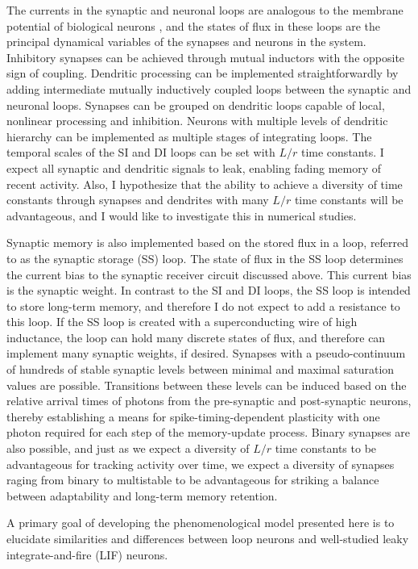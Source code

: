\documentclass[twocolumn]{article}
\begin{document}
The currents in the synaptic and neuronal loops are analogous to the membrane potential of biological neurons \cite{daab2001,geki2002}, and the states of flux in these loops are the principal dynamical variables of the synapses and neurons in the system. Inhibitory synapses can be achieved through mutual inductors with the opposite sign of coupling. Dendritic processing can be implemented straightforwardly by adding intermediate mutually inductively coupled loops between the synaptic and neuronal loops. Synapses can be grouped on dendritic loops capable of local, nonlinear processing and inhibition. Neurons with multiple levels of dendritic hierarchy can be implemented as multiple stages of integrating loops. The temporal scales of the SI and DI loops can be set with $L/r$ time constants. I expect all synaptic and dendritic signals to leak, enabling fading memory of recent activity. Also, I hypothesize that the ability to achieve a diversity of time constants through synapses and dendrites with many $L/r$ time constants will be advantageous, and I would like to investigate this in numerical studies.

Synaptic memory is also implemented based on the stored flux in a loop, referred to as the synaptic storage (SS) loop. The state of flux in the SS loop determines the current bias to the synaptic receiver circuit discussed above. This current bias is the synaptic weight. In contrast to the SI and DI loops, the SS loop is intended to store long-term memory, and therefore I do not expect to add a resistance to this loop. If the SS loop is created with a superconducting wire of high inductance, the loop can hold many discrete states of flux, and therefore can implement many synaptic weights, if desired. Synapses with a pseudo-continuum of hundreds of stable synaptic levels between minimal and maximal saturation values are possible. Transitions between these levels can be induced based on the relative arrival times of photons from the pre-synaptic and post-synaptic neurons, thereby establishing a means for spike-timing-dependent plasticity with one photon required for each step of the memory-update process. Binary synapses are also possible, and just as we expect a diversity of $L/r$ time constants to be advantageous for tracking activity over time, we expect a diversity of synapses raging from binary to multistable to be advantageous for striking a balance between adaptability and long-term memory retention.

A primary goal of developing the phenomenological model presented here is to elucidate similarities and differences between loop neurons and well-studied leaky integrate-and-fire (LIF) neurons. 
\end{document}
